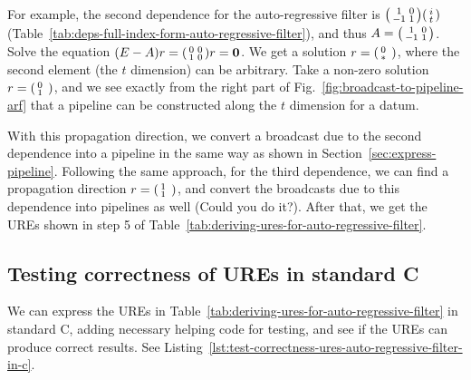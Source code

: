 For example, the second dependence for the auto-regressive filter is $\begin{psmallmatrix} 1 & 0 \\ -1 & 1\end{psmallmatrix}  \begin{psmallmatrix} i \\ t\end{psmallmatrix}$ (Table~\ref{tab:deps-full-index-form-auto-regressive-filter}), and thus $A=\begin{psmallmatrix} 1 & 0 \\ -1 & 1\end{psmallmatrix}$. Solve the equation $(E-A)r=\begin{psmallmatrix} 0 & 0 \\ 1 & 0\end{psmallmatrix}r=\mathbf{0}$. We get a solution $r=\begin{psmallmatrix} 0 &\\ *\end{psmallmatrix}$, where the second element (the $t$ dimension)  can be arbitrary. Take a non-zero solution $r=\begin{psmallmatrix} 0 &\\ 1\end{psmallmatrix}$, and we see exactly from the right part of Fig.~\ref{fig:broadcast-to-pipeline-arf} that a  pipeline can be constructed along the $t$ dimension for a datum. 

With this propagation direction, we convert a broadcast due to the second dependence into a pipeline in the same way as shown in Section~\ref{sec:express-pipeline}. Following the same approach, for the third dependence, we can find a propagation direction $r=\begin{psmallmatrix} 1 &\\ 1\end{psmallmatrix}$, and convert the broadcasts due to this dependence into pipelines as well (Could you do it?). After that, we get the UREs shown in step 5 of  Table~\ref{tab:deriving-ures-for-auto-regressive-filter}.

\subsection{Testing correctness of UREs in standard C}
\label{sec:test-correctness-ures}

We can express the UREs in Table~\ref{tab:deriving-ures-for-auto-regressive-filter} in standard C, adding necessary helping code for testing, and see if the UREs can produce correct results. See Listing~\ref{lst:test-correctness-ures-auto-regressive-filter-in-c}.  

